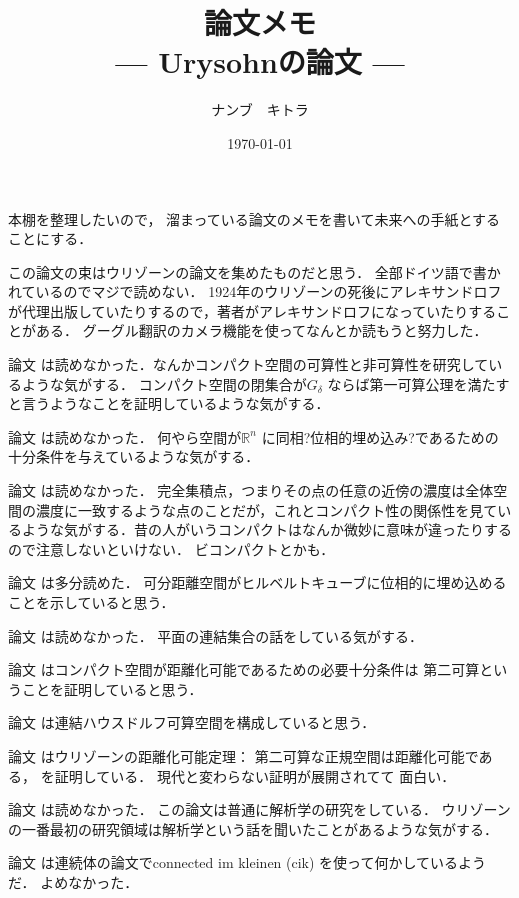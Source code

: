 \documentclass[leqno, a4paper, 12pt]{jsarticle}
\title{論文メモ
\large{\\--- Urysohnの論文 ---}
}
\author{ナンブ　キトラ}
\date{\today}
\newcommand{\rr}{\mathbb{R}}
\begin{document}
\maketitle

本棚を整理したいので，
溜まっている論文のメモを書いて未来への手紙とすることにする．

この論文の束はウリゾーンの論文を集めたものだと思う．
全部ドイツ語で書かれているのでマジで読めない．
1924年のウリゾーンの死後にアレキサンドロフが代理出版していたりするので，著者がアレキサンドロフになっていたりすることがある．
グーグル翻訳のカメラ機能を使ってなんとか読もうと努力した．

論文\cite{MR1512214}
は読めなかった．なんかコンパクト空間の可算性と非可算性を研究しているような気がする．
コンパクト空間の閉集合が$G_{\delta}$
ならば第一可算公理を満たすと言うようなことを証明しているような気がする．

論文
\cite{MR1512259}
は読めなかった．
何やら空間が$\rr^{n}$
に同相?位相的埋め込み?であるための十分条件を与えているような気がする．


論文
\cite{MR1512213}
は読めなかった．
完全集積点，つまりその点の任意の近傍の濃度は全体空間の濃度に一致するような点のことだが，これとコンパクト性の関係性を見ているような気がする．昔の人がいうコンパクトはなんか微妙に意味が違ったりするので注意しないといけない．
ビコンパクトとかも．

論文
\cite{MR1512217}
は多分読めた．
可分距離空間がヒルベルトキューブに位相的に埋め込めることを示していると思う．


論文
\cite{MR1544691}
は読めなかった．
平面の連結集合の話をしている気がする．


論文
\cite{MR1512215}
はコンパクト空間が距離化可能であるための必要十分条件は
第二可算ということを証明していると思う．

論文
\cite{MR1512258}
は連結ハウスドルフ可算空間を構成していると思う．



論文
\cite{MR1512260}
はウリゾーンの距離化可能定理：
第二可算な正規空間は距離化可能である，
を証明している．
現代と変わらない証明が展開されてて
面白い．

論文
\cite{MR1544734}
は読めなかった．
この論文は普通に解析学の研究をしている．
ウリゾーンの一番最初の研究領域は解析学という話を聞いたことがあるような気がする．

論文
\cite{MR1512406}
は連続体の論文でconnected im kleinen (cik)
を使って何かしているようだ．
よめなかった．


\nocite{*}


\end{document}

